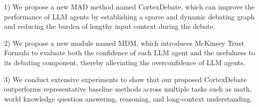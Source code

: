 1) We propose a new MAD method named CortexDebate, which can improve the performance of LLM agents by establishing a sparse and dynamic debating graph and reducing the burden of lengthy input context during the debate.

2) We propose a new module named MDM, which introduces McKinsey Trust Formula to evaluate both the confidence of each LLM agent and the usefulness to its debating component, thereby alleviating the overconfidence of LLM agents.

3) We conduct extensive experiments to show that our proposed CortexDebate outperforms representative baseline methods across multiple tasks such as math, world knowledge question answering, reasoning, and long-context understanding.


